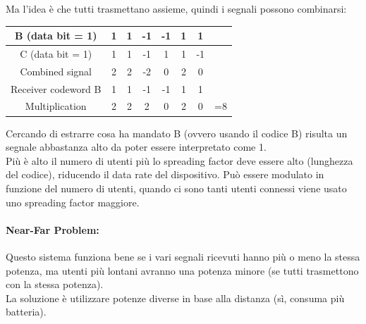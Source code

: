 Ma l'idea è che tutti trasmettano assieme, quindi i segnali possono combinarsi:
\begin{center}
	{
	\renewcommand{\arraystretch}{1.2}
	\begin{tabular}{|c|c|c|c|c|c|c|c|}
		\hline
		B (data bit = 1) & 1 & 1 & -1 & -1 & 1 & 1 &\\ 
		\hline
		C (data bit = 1) & 1 & 1 & -1 & 1 & 1 & -1 &\\ 
		\hline
		Combined signal & 2 & 2 & -2 & 0 & 2 & 0 & \\ 
		\hline
		Receiver codeword B & 1 & 1 & -1 & -1 & 1 & 1 & \\ 
		\hline
		Multiplication & 2 & 2 & 2 & 0 & 2 & 0 & =8 \\ 
		\hline
	\end{tabular}
	}
\end{center}
Cercando di estrarre cosa ha mandato B (ovvero usando il codice B) risulta un segnale abbastanza alto da poter essere interpretato come 1.\\

Più è alto il numero di utenti più lo spreading factor deve essere alto (lunghezza del codice), riducendo il data rate del dispositivo. Può essere modulato in funzione del numero di utenti, quando ci sono tanti utenti connessi viene usato uno spreading factor maggiore.\\

\paragraph{Near-Far Problem:} Questo sistema funziona bene se i vari segnali ricevuti hanno più o meno la stessa potenza, ma utenti più lontani avranno una potenza minore (se tutti trasmettono con la stessa potenza).\\
La soluzione è utilizzare potenze diverse in base alla distanza (sì, consuma più batteria).\\